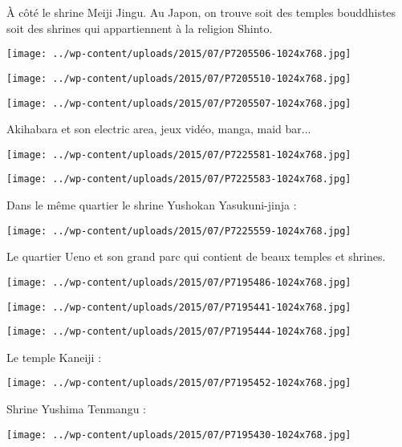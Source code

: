 \pagebreak
 \`A côté le shrine Meiji Jingu. Au Japon, on trouve soit des temples bouddhistes soit des shrines qui appartiennent à la religion Shinto. 
\begin{center} \texttt{[image: ../wp-content/uploads/2015/07/P7205506-1024x768.jpg]} \end{center}
\begin{center} \texttt{[image: ../wp-content/uploads/2015/07/P7205510-1024x768.jpg]} \end{center}
\begin{center} \texttt{[image: ../wp-content/uploads/2015/07/P7205507-1024x768.jpg]} \end{center}

 Akihabara et son \og electric area\fg, jeux vidéo, manga, maid bar...
\begin{center} \texttt{[image: ../wp-content/uploads/2015/07/P7225581-1024x768.jpg]} \end{center}
\begin{center} \texttt{[image: ../wp-content/uploads/2015/07/P7225583-1024x768.jpg]} \end{center}

  Dans le même quartier le shrine Yushokan Yasukuni-jinja :
\begin{center} \texttt{[image: ../wp-content/uploads/2015/07/P7225559-1024x768.jpg]} \end{center}

\pagebreak
  Le quartier Ueno et son grand parc qui contient de beaux temples et shrines. 
\begin{center} \texttt{[image: ../wp-content/uploads/2015/07/P7195486-1024x768.jpg]} \end{center}
\begin{center} \texttt{[image: ../wp-content/uploads/2015/07/P7195441-1024x768.jpg]} \end{center}
\begin{center} \texttt{[image: ../wp-content/uploads/2015/07/P7195444-1024x768.jpg]} \end{center}

  Le temple Kaneiji :
\begin{center} \texttt{[image: ../wp-content/uploads/2015/07/P7195452-1024x768.jpg]} \end{center}

\pagebreak
 Shrine Yushima Tenmangu : 
\begin{center} \texttt{[image: ../wp-content/uploads/2015/07/P7195430-1024x768.jpg]} \end{center}

